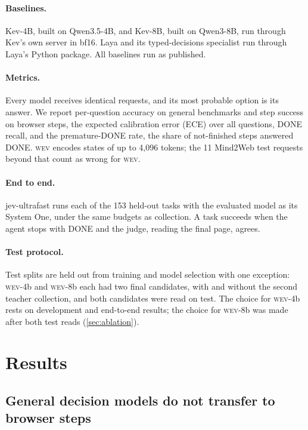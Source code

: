 \documentclass{article}
\newcommand{\wev}{\textsc{wev}\xspace}
\begin{document}
\paragraph{Baselines.} Kev-4B, built on Qwen3.5-4B, and Kev-8B, built on Qwen3-8B, run through Kev's own server in
bf16. Laya and its typed-decisions specialist run through Laya's Python package. All baselines run as published.

\paragraph{Metrics.} Every model receives identical requests, and its most probable option is its answer. We report
per-question accuracy on general benchmarks and step success on browser steps, the expected calibration error (ECE)
\citep{guo2017calibration} over all questions, DONE recall, and the premature-DONE rate, the share of not-finished steps
answered DONE. \wev encodes states of up to 4{,}096 tokens; the 11 Mind2Web test requests beyond that count as wrong for
\wev.

\paragraph{End to end.} jev-ultrafast runs each of the 153 held-out tasks with the evaluated model as its System One,
under the same budgets as collection. A task succeeds when the agent stops with DONE and the judge, reading the final
page, agrees.

\paragraph{Test protocol.} Test splits are held out from training and model selection with one exception: \wev-4b and
\wev-8b each had two final candidates, with and without the second teacher collection, and both candidates were read
on test. The choice for \wev-4b rests on development and end-to-end results; the choice for \wev-8b was made after both
test reads (\cref{sec:ablation}).

\section{Results}
\label{sec:results}

\subsection{General decision models do not transfer to browser steps}
\label{sec:results-browser}
\end{document}

